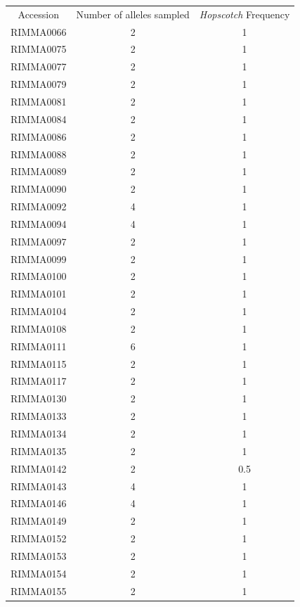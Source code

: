 \documentclass[11pt]{article}
\begin{document}
\begin{linenumbers}
\begin{flushleft}
\begin{table}[htbp]
  \centering
    \begin{tabular}{ccc}
    Accession & Number of alleles sampled & \emph{Hopscotch} Frequency \\
    RIMMA0066 & 2     & 1 \\
    RIMMA0075 & 2     & 1 \\
    RIMMA0077 & 2     & 1 \\
    RIMMA0079 & 2     & 1 \\
    RIMMA0081 & 2     & 1 \\
    RIMMA0084 & 2     & 1 \\
    RIMMA0086 & 2     & 1 \\
    RIMMA0088 & 2     & 1 \\
    RIMMA0089 & 2     & 1 \\
    RIMMA0090 & 2     & 1 \\
    RIMMA0092 & 4     & 1 \\
    RIMMA0094 & 4     & 1 \\
    RIMMA0097 & 2     & 1 \\
    RIMMA0099 & 2     & 1 \\
    RIMMA0100 & 2     & 1 \\
    RIMMA0101 & 2     & 1 \\
    RIMMA0104 & 2     & 1 \\
    RIMMA0108 & 2     & 1 \\
    RIMMA0111 & 6     & 1 \\
    RIMMA0115 & 2     & 1 \\
    RIMMA0117 & 2     & 1 \\
    RIMMA0130 & 2     & 1 \\
    RIMMA0133 & 2     & 1 \\
    RIMMA0134 & 2     & 1 \\
    RIMMA0135 & 2     & 1 \\
    RIMMA0142 & 2     & 0.5 \\
    RIMMA0143 & 4     & 1 \\
    RIMMA0146 & 4     & 1 \\
    RIMMA0149 & 2     & 1 \\
    RIMMA0152 & 2     & 1 \\
    RIMMA0153 & 2     & 1 \\
    RIMMA0154 & 2     & 1 \\
    RIMMA0155 & 2     & 1 \\

\end{tabular}
\end{table}
\end{flushleft}
\end{linenumbers}
\end{document}
